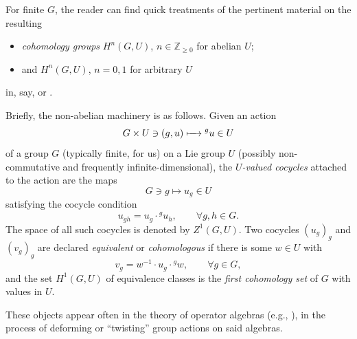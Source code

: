 \documentclass[11pt]{article}
\numberwithin{equation}{section}
\numberwithin{equation}{section}
\newcommand\bZ{{\mathbb Z}}
\begin{document}
For finite $G$, the reader can find quick treatments of the pertinent material on the resulting
\begin{itemize}\itemsep=0pt
\item {\it cohomology groups} $H^n(G,U)$, $n\in \bZ_{\ge 0}$ for abelian $U$;
\item and $H^n(G,U)$, $n=0,1$ for arbitrary $U$
\end{itemize}
in, say, \cite[Chapter VII and its Appendix]{ser-lf} or \cite[Sections~I.2 and I.5]{ser-gal}.

Briefly, the non-abelian machinery is as follows. Given an action
\begin{equation}\label{eq:gactu}
 G\times U\ni (g,u)\xmapsto{\quad} {}^gu\in U
\end{equation}
of a group $G$ (typically finite, for us) on a Lie group $U$ (possibly non-commutative and frequently infinite-dimensional), the {\it $U$-valued cocycles} attached to the action are the maps
\begin{equation}\label{eq:gtoug}
 G\ni g\mapsto u_g\in U
\end{equation}
satisfying the cocycle condition
\begin{equation}\label{eq:cocyccond}
 u_{gh} = u_g\cdot {}^g u_h,\qquad \forall g,h\in G.
\end{equation}
The space of all such cocycles is denoted by $Z^1(G,U)$. Two cocycles $(u_g)_g$ and $(v_g)_g$ are declared {\it equivalent} or {\it cohomologous} if there is some $w\in U$ with
\begin{equation*}
 v_g = w^{-1}\cdot u_g\cdot {}^g w,\qquad \forall g\in G,
\end{equation*}
and the set $H^1(G,U)$ of equivalence classes is the {\it first cohomology set} of $G$ with values in $U$.

These objects appear often in the theory of operator algebras (e.g., \cite[Definition X.1.4]{tak2}), in the process of deforming or ``twisting'' group actions on said algebras.
\end{document}
